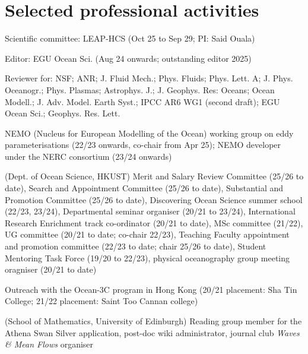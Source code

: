 \documentclass[letterpaper]{article}
\renewenvironment{itemize}{
  \begin{list}{}{
    \setlength{\leftmargin}{1.5em}
  }
}{
  \end{list}
}
\begin{document}
\section*{Selected professional activities}
\begin{itemize}

\item[--] Scientific committee: LEAP-HCS (Oct 25 to Sep 29; PI: Said Ouala)

\item[--] Editor: EGU Ocean Sci. (Aug 24 onwards; outstanding editor 2025)

\item[--] Reviewer for: NSF; ANR; J. Fluid Mech.; Phys. Fluids; Phys. Lett. A; J. Phys. Oceanogr.; Phys. Plasmas; Astrophys. J.; J. Geophys. Res: Oceans; Ocean Modell.; J. Adv. Model. Earth Syst.; IPCC AR6 WG1 (second draft); EGU Ocean Sci.; Geophys. Res. Lett.

\item[--] NEMO (Nucleus for European Modelling of the Ocean) working group on eddy parameterisations (22/23 onwards, co-chair from Apr 25); NEMO developer under the NERC consortium (23/24 onwards)

\item[--] (Dept. of Ocean Science, HKUST) Merit and Salary Review Committee (25/26 to date), Search and Appointment Committee (25/26 to date), Substantial and Promotion Committee (25/26 to date), Discovering Ocean Science summer school (22/23, 23/24), Departmental seminar organiser (20/21 to 23/24), International Research Enrichment track co-ordinator (20/21 to date), MSc committee (21/22), UG committee (20/21 to date; co-chair 22/23), Teaching Faculty appointment and promotion committee (22/23 to date; chair 25/26 to date), Student Mentoring Task Force (19/20 to 22/23), physical oceanography group meeting oragniser (20/21 to date)

\item[--] Outreach with the Ocean-3C program in Hong Kong (20/21 placement: Sha Tin College; 21/22 placement: Saint Too Cannan college)

\item[--] (School of Mathematics, University of Edinburgh) Reading group member for the Athena Swan Silver application, post-doc wiki administrator, journal club \textit{Waves \& Mean Flows} organiser 

\end{itemize}
\end{document}
